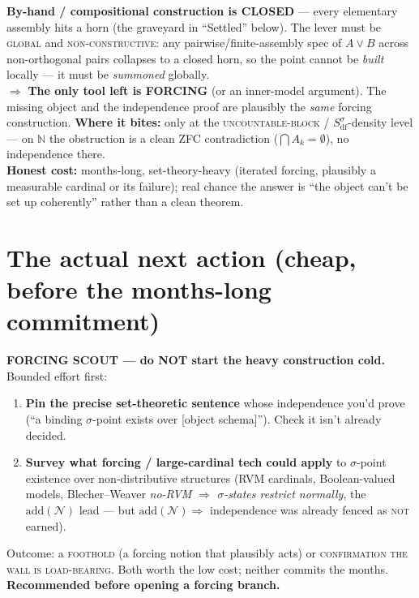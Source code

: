 \documentclass[9pt]{extarticle}
\newcommand{\Sdfs}{S_{\mathrm{df}}^{\sigma}}
\begin{document}
\begin{door}
\textbf{By-hand / compositional construction is CLOSED} --- every elementary assembly
hits a horn (the graveyard in ``Settled'' below). The lever must be \textsc{global} and
\textsc{non-constructive}: any pairwise/finite-assembly spec of $A\vee B$ across
non-orthogonal pairs collapses to a closed horn, so the point cannot be \emph{built}
locally --- it must be \emph{summoned} globally.\\[2pt]
$\Rightarrow$ \textbf{The only tool left is FORCING} (or an inner-model argument). The
missing object and the independence proof are plausibly the \emph{same} forcing
construction. \textbf{Where it bites:} only at the \textsc{uncountable-block} /
$\Sdfs$-density level --- on $\mathbb{N}$ the obstruction is a clean ZFC contradiction
($\bigcap A_k=\emptyset$), no independence there.\\[2pt]
\textbf{Honest cost:} months-long, set-theory-heavy (iterated forcing, plausibly a
measurable cardinal or its failure); real chance the answer is ``the object can't be set
up coherently'' rather than a clean theorem.
\end{door}

\section*{The actual next action (cheap, before the months-long commitment)}

\begin{door}
\textbf{FORCING SCOUT --- do NOT start the heavy construction cold.} Bounded effort first:
\begin{enumerate}[label=(\arabic*),leftmargin=2.2em,topsep=1pt,itemsep=1pt]
  \item \textbf{Pin the precise set-theoretic sentence} whose independence you'd prove
        (``a binding $\sigma$-point exists over [object schema]''). Check it isn't already
        decided.
  \item \textbf{Survey what forcing / large-cardinal tech could apply} to $\sigma$-point
        existence over non-distributive structures (RVM cardinals, Boolean-valued models,
        Blecher--Weaver \emph{no-RVM $\Rightarrow$ $\sigma$-states restrict normally}, the
        $\mathrm{add}(\mathcal{N})$ lead --- but $\mathrm{add}(\mathcal{N})\Rightarrow$
        independence was already fenced as \textsc{not} earned).
\end{enumerate}
Outcome: a \textsc{foothold} (a forcing notion that plausibly acts) or
\textsc{confirmation the wall is load-bearing}. Both worth the low cost; neither commits
the months. \textbf{Recommended before opening a forcing branch.}
\end{door}
\end{document}
